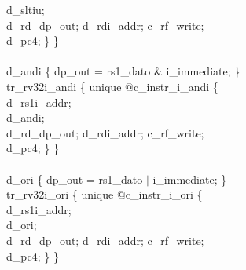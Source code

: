 {\indent \hspace{\parindent} d\_sltiu; \\%
\indent \hspace{\parindent} d\_rd\_dp\_out; d\_rdi\_addr; c\_rf\_write;  \\%
\indent \hspace{\parindent} d\_pc4; \} \} \\%
\\
\indent d\_andi \{ dp\_out = rs1\_dato \& i\_immediate; \}\\%
\indent tr\_rv32i\_andi \{ unique @c\_instr\_i\_andi \{ \\%
\indent \hspace{\parindent} d\_rs1i\_addr; \\%
\indent \hspace{\parindent} d\_andi; \\%
\indent \hspace{\parindent} d\_rd\_dp\_out; d\_rdi\_addr; c\_rf\_write;  \\%
\indent \hspace{\parindent} d\_pc4; \} \} \\%
\\
\indent d\_ori \{ dp\_out = rs1\_dato $\vert$ i\_immediate; \}\\%
\indent tr\_rv32i\_ori \{ unique @c\_instr\_i\_ori \{ \\%
\indent \hspace{\parindent} d\_rs1i\_addr; \\%
\indent \hspace{\parindent} d\_ori; \\%
\indent \hspace{\parindent} d\_rd\_dp\_out; d\_rdi\_addr; c\_rf\_write;  \\%
\indent \hspace{\parindent} d\_pc4; \} \} \\%
\\
}
